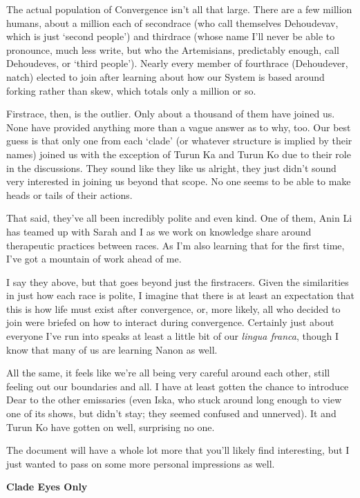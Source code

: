 The actual population of Convergence isn't all that large. There are a few million humans, about a million each of secondrace (who call themselves Dehoudevav, which is just `second people') and thirdrace (whose name I'll never be able to pronounce, much less write, but who the Artemisians, predictably enough, call Dehoudeves, or `third people'). Nearly every member of fourthrace (Dehoudever, natch) elected to join after learning about how our System is based around forking rather than skew, which totals only a million or so.

Firstrace, then, is the outlier. Only about a thousand of them have joined us. None have provided anything more than a vague answer as to why, too. Our best guess is that only one from each `clade' (or whatever structure is implied by their names) joined us with the exception of Turun Ka and Turun Ko due to their role in the discussions. They sound like they like us alright, they just didn't sound very interested in joining us beyond that scope. No one seems to be able to make heads or tails of their actions.

That said, they've all been incredibly polite and even kind. One of them, Anin Li has teamed up with Sarah and I as we work on knowledge share around therapeutic practices between races. As I'm also learning that for the first time, I've got a mountain of work ahead of me.

I say they above, but that goes beyond just the firstracers. Given the similarities in just how each race is polite, I imagine that there is at least an expectation that this is how life must exist after convergence, or, more likely, all who decided to join were briefed on how to interact during convergence. Certainly just about everyone I've run into speaks at least a little bit of our \emph{lingua franca}, though I know that many of us are learning Nanon as well.

All the same, it feels like we're all being very careful around each other, still feeling out our boundaries and all. I have at least gotten the chance to introduce Dear to the other emissaries (even Iska, who stuck around long enough to view one of its shows, but didn't stay; they seemed confused and unnerved). It and Turun Ko have gotten on well, surprising no one.

The document will have a whole lot more that you'll likely find interesting, but I just wanted to pass on some more personal impressions as well.

\textbf{Clade Eyes Only}

